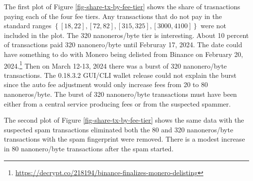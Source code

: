 \documentclass[usletter,11pt,english,openany]{article}
\begin{document}
The first plot of Figure \ref{fig-share-tx-by-fee-tier} shows the
share of trasnactions paying each of the four fee tiers. Any transactions
that do not pay in the standard ranges $\left\{ \left[18,22\right],\left[72,82\right],\left[315,325\right],\left[3000,4100\right]\right\} $
were not included in the plot. The 320 nanoneros/byte tier is interesting.
About 10 percent of transactions paid 320 nanonero/byte until Februray
17, 2024. The date could have something to do with Monero being delisted
from Binance on February 20, 2024.\footnote{\url{https://decrypt.co/218194/binance-finalizes-monero-delisting}}
Then on March 12-13, 2024 there was a burst of 320 nanonero/byte transactions.
The 0.18.3.2 GUI/CLI wallet release could not explain the burst since
the auto fee adjustment would only increase fees from 20 to 80 nanoneros/byte.
The burst of 320 nanonero/byte transactions must have been either
from a central service producing fees or from the suspected spammer.

The second plot of Figure \ref{fig-share-tx-by-fee-tier} shows the
same data with the suspected spam transactions eliminated both the
80 and 320 nanoneros/byte transactions with the spam fingerprint were
removed. There is a modest increase in 80 nanonero/byte transactions
after the spam started.
\end{document}
